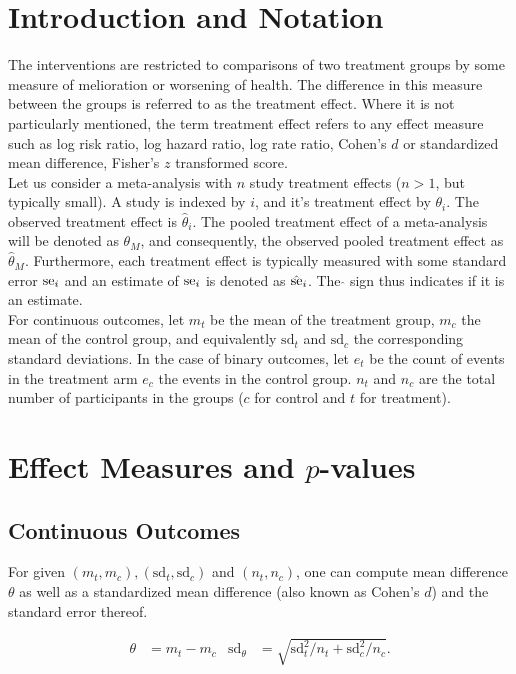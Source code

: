 \documentclass[11pt,a4paper,twoside]{book}\usepackage[]{graphicx}\usepackage[]{color}
\begin{document}
\section{Introduction and Notation}
The interventions are restricted to comparisons of two treatment groups by some measure of melioration or worsening of health. The difference in this measure between the groups is referred to as the treatment effect. Where it is not particularly mentioned, the term treatment effect refers to any effect measure such as log risk ratio, log hazard ratio, log rate ratio, Cohen's $d$ or standardized mean difference, Fisher's $z$ transformed score.\\
Let us consider a meta-analysis with $n$ study treatment effects ($n > 1$, but typically small). A study is indexed by $i$, and it's treatment effect by  $\theta_i$. The observed treatment effect is $\hat{\theta}_i$. The pooled treatment effect of a meta-analysis will be denoted as $\theta_M$, and consequently, the observed pooled treatment effect as $\hat{\theta}_M$. Furthermore, each treatment effect is typically measured with some standard error $\operatorname{se}_i$ and an estimate of $\operatorname{se}_i$ is denoted as $\hat{\operatorname{se}}_i$. The $\hat{}$ sign thus indicates if it is an estimate.\\
For continuous outcomes, let $m_t$ be the mean of the treatment group, $m_c$ the mean of the control group, and equivalently $\textrm{sd}_t$ and $\textrm{sd}_c$ the corresponding standard deviations. 
In the case of binary outcomes, let $e_t$ be the count of events in the treatment arm $e_c$ the events in the control group. $n_t$ and $n_c$ are the total number of participants in the groups ($c$ for control and $t$ for treatment).%

\section{Effect Measures and $p$\hspace{0.4mm}-values}
\subsection{Continuous Outcomes}
For given $(m_t, m_c), (\textrm{sd}_t, \textrm{sd}_c)$ and $(n_t, n_c)$, one can compute mean difference $\theta$ as well as a standardized mean difference (also known as Cohen's $d$) and the standard error thereof.

\begin{align}
\theta &= m_t - m_c & \textrm{sd}_\theta &= \sqrt{\textrm{sd}_t^2/n_t + \textrm{sd}_c^2/n_c}.
\end{align}
\end{document}
